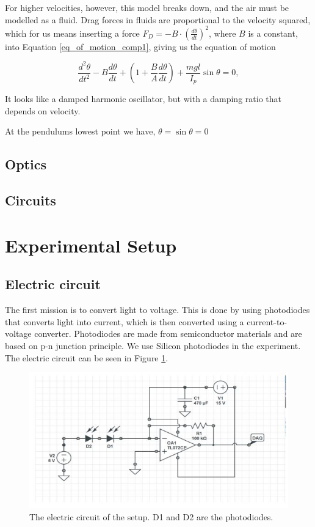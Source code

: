 \documentclass[11pt, a4paper]{article}
\begin{document}
For higher velocities, however, this model breaks down, and the air must be
modelled as a fluid. Drag forces in fluids are proportional to the velocity
squared\cite{drag}, which for us means inserting a force 
$F_D = -B\cdot \left(\frac{d\theta}{dt}\right)^2$, where $B$ is a constant,
into Equation \ref{eq_of_motion_comp1}, giving us the equation of motion

\begin{equation}
    \frac{d^2\theta}{dt^2} 
  - B \frac{d\theta}{dt}
  + \left(1 + \frac{B}{A} \frac{d\theta}{dt} \right)  
  + \frac{mgl}{I_p}\sin{\theta} = 0,
  \label{eq_of_motion_comp2}
\end{equation}

It looks like a damped harmonic oscillator, but with a
damping ratio that depends on velocity. 

At the pendulums lowest point we have, $\theta = \sin{\theta} = 0$



\subsection{Optics}
\subsection{Circuits}


\section{Experimental Setup}
\subsection{Electric circuit}
The first mission is to convert light to voltage. This is done by using photodiodes that converts light into current, which is then converted using a current-to-voltage converter.
Photodiodes are made from semiconductor materials and are based on p-n junction principle. We use Silicon photodiodes in the experiment. The electric circuit can be seen in Figure \ref{f:circuit}.
\begin{figure}[h]
	\centering
	\includegraphics{circuit}
	\caption{The electric circuit of the setup. D1 and D2 are the photodiodes.}
	\label{f:circuit}
\end{figure}
\end{document}
